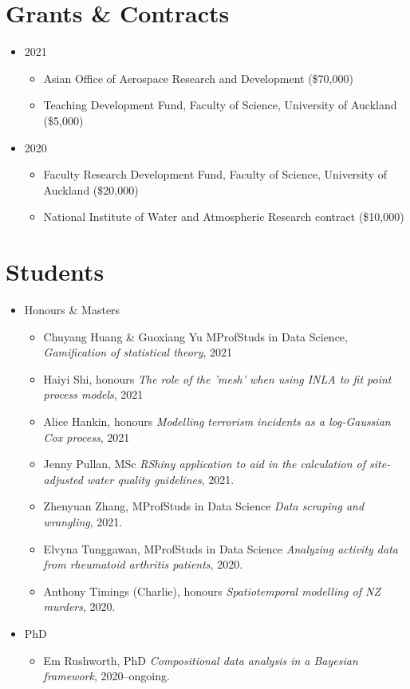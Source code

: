 \documentclass[10pt,a4paper]{moderncv}
\begin{document}

\section{Grants \& Contracts}

\vspace{6pt}
\begin{itemize}
\item 2021
  \begin{itemize}
  \item Asian Office of Aerospace Research and Development (\$70,000)
  \item Teaching Development Fund, Faculty of Science, University of Auckland (\$5,000)
  \end{itemize}
\item 2020
  \begin{itemize}
  \item Faculty Research Development Fund, Faculty of Science, University of Auckland (\$20,000)
  \item National Institute of Water and Atmospheric Research contract (\$10,000)
  \end{itemize}
\end{itemize}

\section{Students}

\vspace{6pt}

\begin{itemize}
\item Honours \& Masters
  \begin{itemize}
  \item Chuyang Huang \& Guoxiang Yu MProfStuds in Data Science, \textit{Gamification of statistical theory}, 2021
  \item Haiyi Shi, honours \textit{The role of the 'mesh' when using INLA to fit point process models}, 2021
  \item Alice Hankin, honours \textit{Modelling terrorism incidents as a log-Gaussian Cox process}, 2021
  \item Jenny Pullan, MSc \textit{RShiny application to aid in the calculation of site-adjusted water quality guidelines}, 2021.
  \item Zhenyuan Zhang, MProfStuds in Data Science \textit{Data scraping and wrangling}, 2021.
  \item Elvyna Tunggawan, MProfStuds in Data Science \textit{Analyzing activity data from rheumatoid arthritis patients}, 2020.
  \item Anthony Timings (Charlie), honours \textit{Spatiotemporal modelling of NZ murders}, 2020.
  \end{itemize}
\item PhD
  \begin{itemize}
  \item Em Rushworth, PhD \textit{Compositional data analysis in a Bayesian framework}, 2020--ongoing.
  \end{itemize}
\end{itemize}
\end{document}

